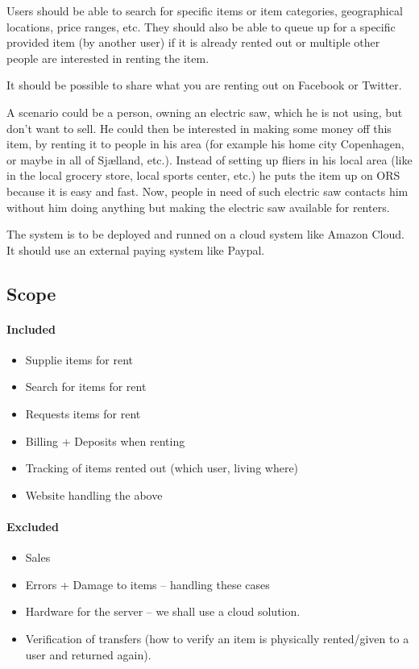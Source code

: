 \documentclass[a4paper,11pt]{report}
\begin{document}
Users should be able to search for specific items or item categories,
geographical locations, price ranges, etc. They should also be able to queue up
for a specific provided item (by another user) if it is already rented out or
multiple other people are interested in renting the item.

It should be possible to share what you are renting out on Facebook or Twitter.

A scenario could be a person, owning an electric saw, which he is not using, but
don't want to sell. He could then be interested in making some money off this
item, by renting it to people in his area (for example his home city Copenhagen,
or maybe in all of Sjælland, etc.). Instead of setting up fliers in his local
area (like in the local grocery store, local sports center, etc.) he puts the
item up on ORS because it is easy and fast. Now, people in need of such electric
saw contacts him without him doing anything but making the electric saw
available for renters.

The system is to be deployed and runned on a cloud system like Amazon Cloud. It should use an external paying system like Paypal.

\subsection{Scope}
\paragraph{Included}
\begin{itemize}
\item Supplie items for rent
\item Search for items for rent
\item Requests items for rent
\item Billing + Deposits when renting
\item Tracking of items rented out (which user, living where)
\item Website handling the above
\end{itemize}

\paragraph{Excluded}
\begin{itemize}
\item Sales
\item Errors + Damage to items -- handling these cases
\item Hardware for the server -- we shall use a cloud solution.
\item Verification of transfers (how to verify an item is physically rented/given to a user and returned again).
\end{itemize}
\end{document}
